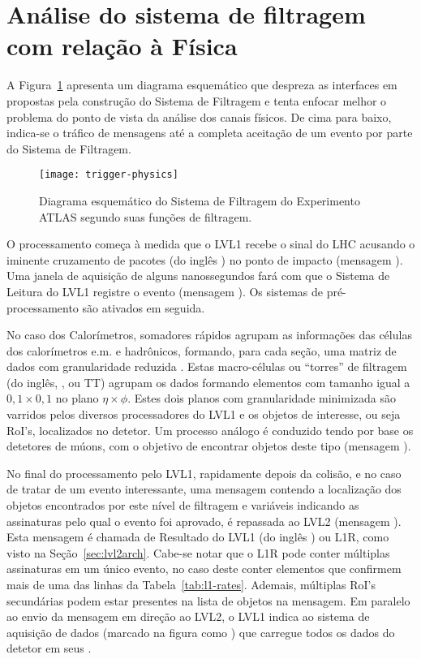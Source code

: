 \section{Análise do sistema de filtragem com relação à Física}

A Figura~\ref{fig:trigger-physics} apresenta um diagrama esquemático que
despreza as interfaces em  propostas pela construção do Sistema
de Filtragem e tenta enfocar melhor o problema do ponto de vista da análise
dos canais físicos. De cima para baixo, indica-se o tráfico de mensagens até a
completa aceitação de um evento por parte do Sistema de Filtragem.

\begin{figure}
\begin{center}
\texttt{[image: trigger-physics]}
\end{center}
\caption{Diagrama esquemático do Sistema de Filtragem do Experimento ATLAS
segundo suas funções de filtragem.}
\label{fig:trigger-physics}
\end{figure}

O processamento começa à medida que o LVL1 recebe o sinal do LHC acusando o
iminente cruzamento de pacotes (do inglês ) no ponto de
impacto (mensagem ). Uma janela de aquisição de alguns nanossegundos
fará com que o Sistema de Leitura do LVL1 registre o evento (mensagem
). Os sistemas de pré-processamento são ativados em seguida.

No caso dos Calorímetros, somadores rápidos \cite{seixas:adder} agrupam as
informações das células dos calorímetros e.m. e hadrônicos, formando, para
cada seção, uma matriz de dados com granularidade reduzida
\cite{l1-tdr}. Estas macro-células ou ``torres'' de filtragem (do inglês,
, ou TT) agrupam os dados formando elementos com tamanho
igual a $0,1\times0,1$ no plano $\eta\times\phi$. Estes dois planos com
granularidade minimizada são varridos pelos diversos processadores do LVL1 e
os objetos de interesse, ou seja RoI's, localizados no detetor. Um processo
análogo é conduzido tendo por base os detetores de múons, com o objetivo de
encontrar objetos deste tipo (mensagem ).

No final do processamento pelo LVL1, rapidamente depois da colisão, e no caso
de tratar de um evento interessante, uma mensagem contendo a localização dos
objetos encontrados por este nível de filtragem e variáveis indicando as
assinaturas pelo qual o evento foi aprovado, é repassada ao LVL2
(mensagem ). Esta mensagem é chamada de Resultado do LVL1 (do inglês
) ou L1R, como visto na Seção~\ref{sec:lvl2arch}. Cabe-se
notar que o L1R pode conter múltiplas assinaturas em um único evento, no caso
deste conter elementos que confirmem mais de uma das linhas da
Tabela~\ref{tab:l1-rates}. Ademais, múltiplas RoI's secundárias podem estar
presentes na lista de objetos na mensagem. Em paralelo ao envio da mensagem em
direção ao LVL2, o LVL1 indica ao sistema de aquisição de dados (marcado na
figura como ) que carregue todos os dados do detetor em seus
.

